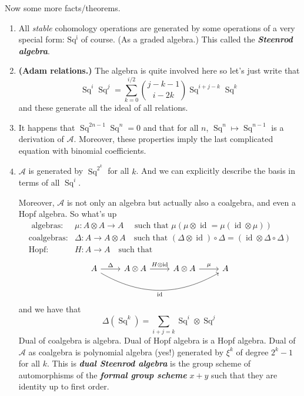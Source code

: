 \documentclass{article}
\begin{document}
\begin{example}
\begin{thm}
\begin{enumerate}
\end{enumerate}
\end{thm}
Now some more facts/theorems.
\begin{thm}
	\begin{enumerate}
		\item All \textit{stable} cohomology operations are generated by some operations of a very special form: $\operatorname{Sq^i}$ of course. (As a graded algebra.) This called the \textit{\textbf{Steenrod algebra}}.
		\item \textbf{(Adam relations.)} The algebra is quite involved here so let's just write that
			\[\operatorname{Sq}^i\operatorname{Sq}^j=\sum_{k=0}^{i/2}{j-k-1\choose i-2k} \operatorname{Sq}^{i+j-k}\operatorname{Sq}^k\]
			and these generate all the ideal of all relations.
		\item It happens that $\operatorname{Sq}^{2n-1}\operatorname{Sq}^n=0$ and that for all $n$, $\operatorname{Sq}^n\mapsto \operatorname{Sq}^{n-1}$ is a derivation of $\mathcal{A}$. Moreover, these properties imply the last complicated equation with binomial coefficients.

		\item $\mathcal{A}$ is generated by $\operatorname{Sq}^{2^k}$ for all $k$. And we can explicitly describe the basis in terms of all $\operatorname{Sq}^i$.

		Moreover, $\mathcal{A}$ is not only an algebra but actually also a coalgebra, and even a Hopf algebra. So what's up
		\begin{align*}
			\text{ algebras}: &\mu:A\otimes A\to A\quad \text{ such that } \mu(\mu\otimes \operatorname{id}=\mu(\operatorname{id}\otimes \mu))\\
			\text{coalgebras}:&\Delta:A\to A\otimes A\quad \text{such that }  (\Delta\otimes \operatorname{id})\circ \Delta=(\operatorname{id}\otimes \Delta\circ \Delta)\\
			\text{Hopf} :&H:A\to A\quad \text{such that}

			\end{align*}
			\[\begin{tikzcd}
				A \arrow[rrr,bend right,swap,"\operatorname{id}"]\arrow[r,"\Delta"]&A\otimes A \arrow[r,"H\otimes \operatorname{id}"]&A\otimes A \arrow[r,"\mu"]&A
			\end{tikzcd}\]
		and we have that
		\[\Delta(\operatorname{Sq}^k)=\sum_{i+j=k}\operatorname{Sq}^i\otimes \operatorname{Sq}^j\]
		Dual of coalgebra is algebra. Dual of Hopf algebra is a Hopf algebra. Dual of $\mathcal{A}$ as coalgebra is polynomial algebra (yes!) generated by $\xi^k$ of degree $2^k-1$ for all $k$. This is \textit{\textbf{dual Steenrod algebra}} is the group scheme of automorphisms of the \textit{\textbf{formal group scheme}} $x+y$ such that they are identity up to first order.
	\end{enumerate}
\end{thm}


\end{example}
\end{document}
